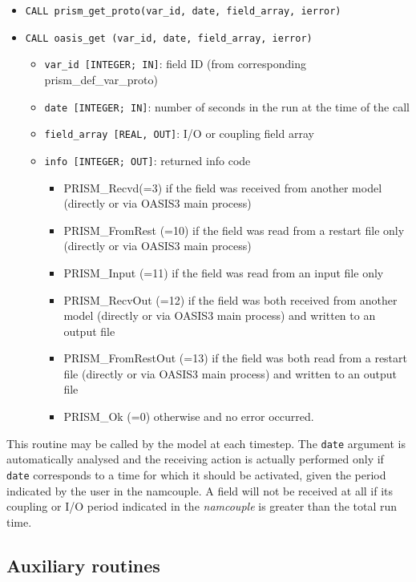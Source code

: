 \begin{itemize} 

\item {\tt CALL prism\_get\_proto(var\_id, date, field\_array, ierror)}
\item {\tt CALL oasis\_get       (var\_id, date, field\_array, ierror)}
\begin{itemize}
\item {\tt var\_id [INTEGER; IN]}: field ID (from
  corresponding prism\_def\_var\_proto)
\item {\tt date [INTEGER; IN]}: number of seconds in the run at the
time of the call
\item {\tt field\_array [REAL, OUT]}: I/O or coupling field array 
\item {\tt info [INTEGER; OUT]}: returned info code
   \begin{itemize} 
      \item PRISM\_Recvd(=3) if the field was received from another model
       (directly or via OASIS3 main process)
      \item PRISM\_FromRest (=10) if the field was read from a restart
       file only (directly or via OASIS3 main process)
      \item PRISM\_Input (=11) if the field was read from an input
       file only
      \item PRISM\_RecvOut (=12) if the field was both received from
       another model (directly or via OASIS3 main process) and written to
       an output file
      \item PRISM\_FromRestOut (=13) if the field was both read from a
       restart file (directly or via OASIS3 main process) and written to an
       output file
      \item PRISM\_Ok (=0) otherwise and no error occurred.
   \end{itemize}
\end{itemize}
\end{itemize}

This routine may be called by the model at each timestep. The {\tt date}
argument is automatically analysed and the receiving action is actually
performed only if {\tt date} corresponds to a time for which it should
be activated, given the period indicated by the user in the
namcouple. A field will not be received at all if its
coupling or I/O period indicated in the {\it namcouple} is greater
than the total run time.

\subsection{Auxiliary routines}
\label{subsec:auxiliary}

